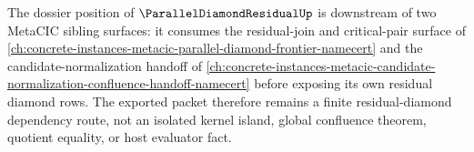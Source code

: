 The dossier position of $\ParallelDiamondResidualUp$ is downstream of two MetaCIC sibling surfaces: it consumes the residual-join and critical-pair surface of \autoref{ch:concrete-instances-metacic-parallel-diamond-frontier-namecert} and the candidate-normalization handoff of \autoref{ch:concrete-instances-metacic-candidate-normalization-confluence-handoff-namecert} before exposing its own residual diamond rows. The exported packet therefore remains a finite residual-diamond dependency route, not an isolated kernel island, global confluence theorem, quotient equality, or host evaluator fact.
